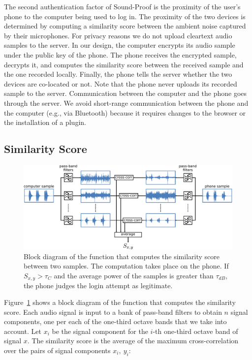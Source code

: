 The second authentication factor of Sound-Proof is the proximity of the user's phone to the computer being used to log in.
The proximity of the two devices is determined by computing a similarity score between the ambient noise captured by their microphones.
For privacy reasons we do not upload cleartext audio samples to the server.
In our design, the computer encrypts its audio sample under the public key of the phone.
The phone receives the encrypted sample, decrypts it, and computes the similarity score between the received sample and the one recorded locally.
Finally, the phone tells the server whether the two devices are co-located or not. Note that the phone never uploads its recorded sample to the server.
Communication between the computer and the phone goes through the server.
We avoid short-range communication between the phone and the computer  (e.g., via Bluetooth) because it requires changes to the browser or the installation of a plugin.

\subsection{Similarity Score}
\label{sec:ps_sp_similarity}

\begin{figure}[!ht]
    \centering
    \includegraphics[width=.9\linewidth]{figures/phonesecures/sound-proof_similarity}
    \caption[Block diagram of the function that computes the similarity score
    between two samples]{Block diagram of the function that computes the
    similarity score between two samples. The computation takes place on the
    phone. If $S_{x,y}>\tau_{C}$ and the average power of the samples is greater
    than $\tau_{dB}$, the phone judges the login attempt as legitimate.}
    \label{fig:ps_sp_similarity}
\end{figure}

Figure~\ref{fig:ps_sp_similarity} shows a block diagram of the function that computes the similarity score.
Each audio signal is input to a bank of pass-band filters to obtain $n$ signal components, one per each of the one-third octave bands that we take into account.
Let $x_i$ be the signal component for the $i$-th one-third octave band of signal $x$.
The similarity score is the average of the maximum cross-correlation over the pairs of signal components $x_i,\ y_i$:

